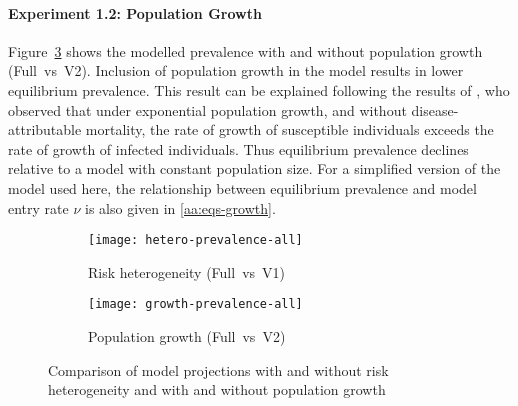 \paragraph{Experiment 1.2: Population Growth}\label{p:res-1-growth}
Figure~\ref{fig:compare-growth-prevalence} shows the modelled prevalence
with and without population growth (Full~vs~V2).
Inclusion of population growth in the model
results in lower equilibrium prevalence.
This result can be explained following the results of \citet{Hadeler1990},
who observed that under exponential population growth,
and without disease-attributable mortality,
the rate of growth of susceptible individuals exceeds
the rate of growth of infected individuals.
Thus equilibrium prevalence declines
relative to a model with constant population size.
For a simplified version of the model used here,
the relationship between equilibrium prevalence and model entry rate $\nu$
is also given in \ref{aa:eqs-growth}.
\begin{figure}
  \centering
  \begin{subfigure}{0.45\linewidth}
    \centering
    \texttt{[image: hetero-prevalence-all]}
    \caption{Risk heterogeneity (Full~vs~V1)}
    \label{fig:compare-hetero-prevalence}
  \end{subfigure}
  \begin{subfigure}{0.45\linewidth}
    \centering
    \texttt{[image: growth-prevalence-all]}
    \caption{Population growth (Full~vs~V2)}
    \label{fig:compare-growth-prevalence}
  \end{subfigure}
  \caption{Comparison of model projections
    with and without risk heterogeneity and
    with and without population growth}
\end{figure}
